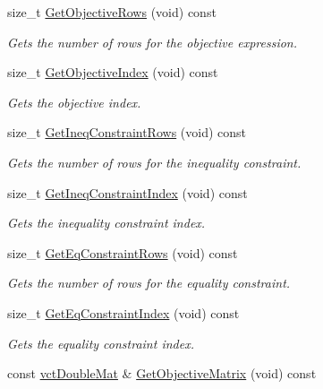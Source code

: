 \begin{DoxyCompactItemize}
size\+\_\+t \hyperlink{classnmr_constraint_optimizer_a4c7b210f3238bd7f2d20abe40ace3898}{Get\+Objective\+Rows} (void) const 
\begin{DoxyCompactList}\small\item\em Gets the number of rows for the objective expression. \end{DoxyCompactList}\item 
size\+\_\+t \hyperlink{classnmr_constraint_optimizer_a99c682a7d2f353bc1943013335ea89fc}{Get\+Objective\+Index} (void) const 
\begin{DoxyCompactList}\small\item\em Gets the objective index. \end{DoxyCompactList}\item 
size\+\_\+t \hyperlink{classnmr_constraint_optimizer_a50363b63412470ee7e1b32af8b2a7946}{Get\+Ineq\+Constraint\+Rows} (void) const 
\begin{DoxyCompactList}\small\item\em Gets the number of rows for the inequality constraint. \end{DoxyCompactList}\item 
size\+\_\+t \hyperlink{classnmr_constraint_optimizer_a192f464d96cc2665b44eb4ba1feadb1b}{Get\+Ineq\+Constraint\+Index} (void) const 
\begin{DoxyCompactList}\small\item\em Gets the inequality constraint index. \end{DoxyCompactList}\item 
size\+\_\+t \hyperlink{classnmr_constraint_optimizer_abe223043a678e4bd88a0c33dd7429a1f}{Get\+Eq\+Constraint\+Rows} (void) const 
\begin{DoxyCompactList}\small\item\em Gets the number of rows for the equality constraint. \end{DoxyCompactList}\item 
size\+\_\+t \hyperlink{classnmr_constraint_optimizer_a7f7971e1b337c9b908dede8f39ff5720}{Get\+Eq\+Constraint\+Index} (void) const 
\begin{DoxyCompactList}\small\item\em Gets the equality constraint index. \end{DoxyCompactList}\item 
const \hyperlink{vct_dynamic_matrix_types_8h_a48f1eb2461d20a99e824ee5753a37c84}{vct\+Double\+Mat} \& \hyperlink{classnmr_constraint_optimizer_a3f488cf21c6f78b7d94915af84432288}{Get\+Objective\+Matrix} (void) const 

\end{DoxyCompactItemize}
